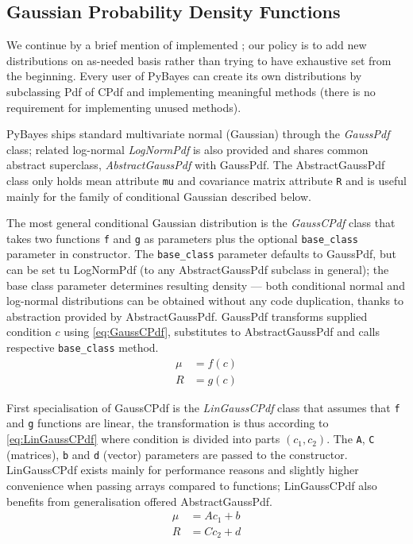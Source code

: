 \subsection{Gaussian Probability Density Functions}

We continue by a brief mention of implemented {\pdfs}; our policy is to add new distributions on
as-needed basis rather than trying to have exhaustive set from the beginning. Every user of
PyBayes can create its own distributions by subclassing Pdf of CPdf and implementing meaningful
methods (there is no requirement for implementing unused methods).

PyBayes ships standard multivariate normal (Gaussian) {\pdf} through the \emph{GaussPdf} class;
related log-normal {\pdf} \emph{LogNormPdf} is also provided and shares common abstract superclass,
\emph{AbstractGaussPdf} with GaussPdf. The AbstractGaussPdf class only holds mean attribute \verb|mu|
and covariance matrix attribute \verb|R| and is useful mainly for the family of conditional Gaussian
{\pdfs} described below.

The most general conditional Gaussian distribution is the \emph{GaussCPdf} class that takes two
functions \verb|f| and \verb|g| as parameters plus the optional \verb|base_class| parameter in
constructor. The \verb|base_class| parameter defaults to GaussPdf, but can be set tu LogNormPdf (to
any AbstractGaussPdf subclass in general); the base class parameter determines resulting density ---
both conditional normal and log-normal distributions can be obtained without any code duplication,
thanks to abstraction provided by AbstractGaussPdf. GaussPdf transforms supplied condition \(c\)
using \eqref{eq:GaussCPdf}, substitutes to AbstractGaussPdf and calls respective \verb|base_class|
method.
\begin{equation} \label{eq:GaussCPdf}
	\begin{aligned}
		\mu &= f(c) \\
		R &= g(c)
	\end{aligned}
\end{equation}

First specialisation of GaussCPdf is the \emph{LinGaussCPdf} class that assumes that \verb|f| and
\verb|g| functions are linear, the transformation is thus according to \eqref{eq:LinGaussCPdf} where
condition is divided into parts \((c_1, c_2)\). The \verb|A|, \verb|C| (matrices), \verb|b| and
\verb|d| (vector) parameters are passed to the constructor. LinGaussCPdf exists mainly for
performance reasons and slightly higher convenience when passing arrays compared to functions;
LinGaussCPdf also benefits from generalisation offered AbstractGaussPdf.
\begin{equation} \label{eq:LinGaussCPdf}
	\begin{aligned}
		\mu &= A c_1 + b \\
		R &= C c_2 + d
	\end{aligned}
\end{equation}

